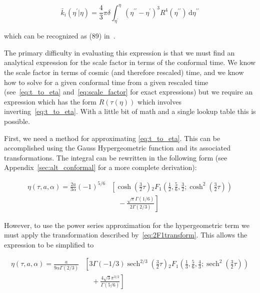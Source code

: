 \documentclass[preprint,notitlepage,amsmath,amssymb,floatfix]{revtex4-1}
\DeclareMathOperator{\sech}{sech}
\begin{document}
\begin{equation}
\label{eq:avg_degree_uni}
\bar{k}_i\left(\eta^\prime|\eta\right) = \frac{4}{3}\pi\delta\int_{\eta^\prime}^\eta\!\left(\eta^{\prime\prime} - \eta^\prime\right)^3 R^4\left(\eta^{\prime\prime}\right)\,\mathrm d\eta^{\prime\prime}
\end{equation}

\noindent which can be recognized as (89) in~\cite{ref:snc2012}. \par
The primary difficulty in evaluating this expression is that we must find an analytical expression for the scale factor in terms of the conformal time.
We know the scale factor in terms of cosmic (and therefore rescaled) time, and we know how to solve for a given conformal time from a given rescaled time (see~\eqref{eq:t_to_eta} and~\eqref{eq:scale_factor} for exact expressions) but we require an expression which has the form $R\left(\tau\left(\eta\right)\right)$ which involves inverting~\eqref{eq:t_to_eta}.
With a little bit of math and a single lookup table this is possible. \par
First, we need a method for approximating \eqref{eq:t_to_eta}.
This can be accomplished using the Gauss Hypergeometric function and its associated transformations.
The integral can be rewritten in the following form (see Appendix~\ref{sec:alt_conformal} for a more complete derivation):

\begin{equation}
\begin{split}
\eta\left(\tau, a, \alpha\right) = \frac{2a}{3\alpha}\left(-1\right)^{5/6}&\left[\cosh\left(\frac{3}{2}\tau\right) {}_2F_1\left(\frac{1}{2},\frac{5}{6},\frac{3}{2};\cosh^2\left(\frac{3}{2}\tau\right)\right)\right. \\
& \quad - \left.\frac{\sqrt{\pi}\Gamma\left(1/6\right)}{2\Gamma\left(2/3\right)}\right]
\end{split}
\end{equation}

\noindent However, to use the power series approximation for the hypergeometric term we must apply the transformation described by~\eqref{eq:2F1transform}.
This allows the expression to be simplified to

\begin{equation}
\begin{split}
\label{eq:conformal_final}
\eta\left(\tau, a, \alpha\right) = \frac{a}{9\alpha\Gamma\left(2/3\right)}&\left[3\Gamma\left(-1/3\right)\sech^{2/3}\left(\frac{3}{2}\tau\right) {}_2F_1\left(\frac{1}{3},\frac{5}{6},\frac{4}{3};\sech^2\left(\frac{3}{2}\tau\right)\right)\right. \\
& \quad + \left.\frac{4\sqrt{3}\pi^{3/2}}{\Gamma\left(5/6\right)}\right]
\end{split}
\end{equation}
\end{document}
